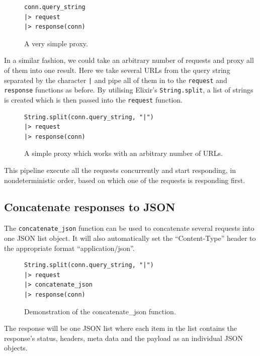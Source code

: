\documentclass{cslthse-msc}
\begin{document}
\begin{figure}[H]
  \centering
\begin{lstlisting}[breaklines=true,frame=single]
conn.query_string
|> request
|> response(conn)
\end{lstlisting}
  \caption{A very simple proxy.}
\end{figure}

In a similar fashion, we could take an arbitrary number of requests and proxy all of them into one result. Here we take several URLs from the query string separated by the character \lstinline{|} and pipe all of them in to the \lstinline{request} and \lstinline{response} functions as before. By utilising Elixir's \lstinline{String.split}, a list of strings is created which is then passed into the \lstinline{request} function.

\begin{figure}[H]
  \centering
\begin{lstlisting}[breaklines=true,frame=single]
String.split(conn.query_string, "|")
|> request
|> response(conn)
\end{lstlisting}
  \caption{A simple proxy which works with an arbitrary number of URLs.}
\end{figure}

This pipeline execute all the requests concurrently and start responding, in nondeterministic order, based on which one of the requests is responding first.

\subsection{Concatenate responses to JSON}
The \lstinline{concatenate_json} function can be used to concatenate several requests into one JSON list object. It will also automatically set the \enquote{Content-Type} header to the appropriate format \enquote{application/json}.

\begin{figure}[H]
  \centering
\begin{lstlisting}[breaklines=true,frame=single]
String.split(conn.query_string, "|")
|> request
|> concatenate_json
|> response(conn)
\end{lstlisting}
  \caption{Demonstration of the concatenate\_json function.}
\end{figure}

The response will be one JSON list where each item in the list contains the response's status, headers, meta data and the payload as an individual JSON objects.
\end{document}
